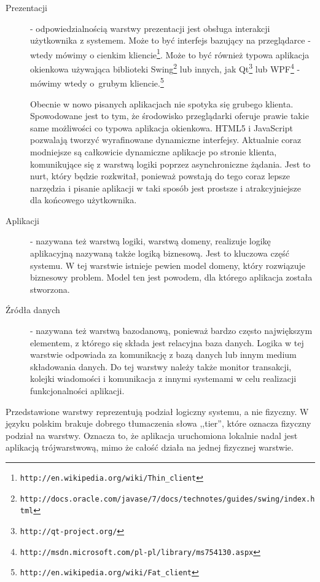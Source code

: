 \documentclass[a4paper,onecolumn,oneside,11pt,wide,floatssmall]{mwrep}
\def\url#1{{ \tt #1}}
\theoremstyle{definition}
\theoremstyle{plain}%
\theoremstyle{remark}
\begin{document}
\begin{description}
  \item[Prezentacji] - odpowiedzialnością warstwy prezentacji jest obsługa interakcji użytkownika z systemem. Może to 
  być interfejs bazujący na przeglądarce - wtedy mówimy o cienkim kliencie\footnote{\url{http://en.wikipedia.org/wiki/Thin\_client}}.
   Może to być również typowa aplikacja okienkowa używająca biblioteki 
   Swing\footnote{\url{http://docs.oracle.com/javase/7/docs/technotes/guides/swing/index.html}} 
   lub innych, jak Qt\footnote{\url{http://qt-project.org/}} lub 
   WPF\footnote{\url{http://msdn.microsoft.com/pl-pl/library/ms754130.aspx}} - mówimy wtedy \mbox{o
       grubym} kliencie.\footnote{\url{http://en.wikipedia.org/wiki/Fat\_client}}

    Obecnie w nowo pisanych aplikacjach nie spotyka się grubego klienta. Spowodowane jest to tym, że środowisko 
    przeglądarki oferuje prawie takie same możliwości co typowa aplikacja okienkowa. HTML5 i JavaScript pozwalają 
    tworzyć wyrafinowane dynamiczne interfejsy. Aktualnie coraz modniejsze są całkowicie dynamiczne aplikacje po 
    stronie klienta, komunikujące się z warstwą logiki poprzez asynchroniczne żądania. Jest to nurt, który będzie 
    rozkwitał, ponieważ powstają do tego coraz lepsze narzędzia i pisanie aplikacji w taki sposób jest prostsze i 
    atrakcyjniejsze dla końcowego użytkownika. 
  
  \item[Aplikacji] - nazywana też warstwą logiki, warstwą domeny, realizuje logikę aplikacyjną nazywaną także logiką 
  biznesową. Jest to kluczowa część systemu. W tej warstwie istnieje pewien model domeny, który rozwiązuje biznesowy 
  problem. Model ten jest powodem, dla którego aplikacja została stworzona. 
  
  \item[Źródła danych] - nazywana też warstwą bazodanową, ponieważ bardzo często największym elementem, z którego się 
  składa jest relacyjna baza danych. Logika w tej warstwie odpowiada za komunikację z bazą danych lub innym medium 
  składowania danych. Do tej warstwy należy także monitor transakcji, kolejki wiadomości i komunikacja z innymi 
  systemami w celu realizacji funkcjonalności aplikacji. 
\end{description}

Przedstawione warstwy reprezentują podział logiczny systemu, a nie fizyczny. W języku polskim brakuje dobrego 
tłumaczenia słowa ,,tier'', które oznacza fizyczny podział na warstwy. Oznacza to, że aplikacja uruchomiona lokalnie 
nadal jest aplikacją trójwarstwową, mimo że całość działa na jednej fizycznej warstwie. 
\end{document}
